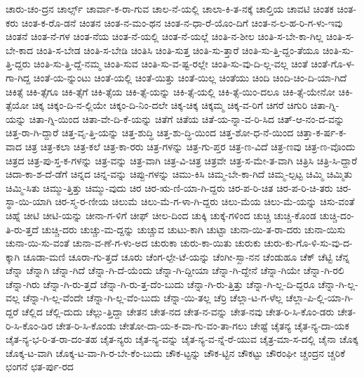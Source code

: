 {ಚಾರು-ಚಂ-ದ್ರನ
ಚಾರ್ಲ್ಸ್
ಚಾರ್ವಾ-ಕ-ರಾ-ಗುವ
ಚಾಲ-ನೆ-ಯಲ್ಲಿ
ಚಾಲಾ-ಕಿ-ತ-ನಕ್ಕೆ
ಚಾಲ್ತಿಯ
ಚಾವಟಿ
ಚಿಂತಕ
ಚಿಂತ-ಕರು
ಚಿಂತ-ಕ-ರೊ-ಡನೆ
ಚಿಂತನ
ಚಿಂತ-ನ-ಮಂ-ಥನ
ಚಿಂತ-ನ-ಧಾ-ರೆ-ಯೊಂ-ದಿಗೆ
ಚಿಂತ-ನ-ಲ-ಹ-ರಿ-ಗ-ಳು-ಇವು
ಚಿಂತನೆ
ಚಿಂತ-ನೆ-ಗಳ
ಚಿಂತ-ನೆಯ
ಚಿಂತ-ನೆ-ಯಲ್ಲಿ
ಚಿಂತ-ನೆ-ಯಲ್ಲೆ
ಚಿಂತಿ-ನ-ಶೀಲ
ಚಿಂತಿ-ಸ-ಬೇ-ಕಾ-ಗಿಲ್ಲ
ಚಿಂತಿ-ಸ-ಬೇ-ಕಾದ
ಚಿಂತಿ-ಸ-ಬೇಡ
ಚಿಂತಿ-ಸ-ಬೇಡಿ
ಚಿಂತಿಸಿ
ಚಿಂತಿ-ಸುತ್ತ
ಚಿಂತಿ-ಸು-ತ್ತಾರೆ
ಚಿಂತಿ-ಸು-ತ್ತಿ-ದ್ದಂ-ತೆಯೂ
ಚಿಂತಿ-ಸು-ತ್ತಿ-ದ್ದರು
ಚಿಂತಿ-ಸು-ತ್ತಿ-ದ್ದೆ-ನಮ್ಮ
ಚಿಂತಿ-ಸುವ
ಚಿಂತಿ-ಸು-ವ-ಷ್ಟ-ರಲ್ಲೇ
ಚಿಂತಿ-ಸು-ವು-ದಿ-ಲ್ಲ-ವಲ್ಲ
ಚಿಂತೆ
ಚಿಂತೆ-ಗೊ-ಳ-ಗಾ-ಗಿದ್ದ
ಚಿಂತೆ-ಯ-ನ್ನುಂಟು
ಚಿಂತೆ-ಯಲ್ಲಿ
ಚಿಂತೆ-ಯಿತ್ತು
ಚಿಂತೆ-ಯಿಲ್ಲ
ಚಿಂತೆಯು
ಚಿಂದಿ
ಚಿಂದಿ-ಚಿಂ-ದಿ-ಯಾ-ಗಿದೆ
ಚಿಕಿತ್ಸೆ
ಚಿಕಿ-ತ್ಸೆಗೂ
ಚಿಕಿ-ತ್ಸೆಗೆ
ಚಿಕಿ-ತ್ಸೆಯ
ಚಿಕಿ-ತ್ಸೆ-ಯನ್ನು
ಚಿಕಿ-ತ್ಸೆ-ಯಲ್ಲಿ
ಚಿಕಿ-ತ್ಸೆ-ಯಿಂ-ದಲೂ
ಚಿಕಿ-ತ್ಸೆ-ಯೇನೋ
ಚಿಕಿ-ತ್ಸೆಯೋ
ಚಿಕ್ಕ
ಚಿಕ್ಕಂ-ದಿ-ನ-ಲ್ಲಿಯೇ
ಚಿಕ್ಕಂ-ದಿ-ನಿಂ-ದಲೇ
ಚಿಕ್ಕ-ಚಿಕ್ಕ
ಚಿಕ್ಕಮ್ಮ
ಚಿಕ್ಕ-ವ-ರಿಗೆ
ಚಿಗರೆ
ಚಿಗುರಿ
ಚಿತಾ-ಗ್ನಿ-ಯನ್ನು
ಚಿತಾ-ಗ್ನಿ-ಯಿಂದ
ಚಿತಾ-ವೇ-ದಿ-ಕೆ-ಯನ್ನು
ಚಿತೆಗೆ
ಚಿತೆಯ
ಚಿತೆ-ಯ-ನ್ನಾ-ವ-ರಿ-ಸಿದ
ಚಿತ್-ಆ-ನಂ-ದ-ವನ್ನು
ಚಿತ್ತ-ರಾ-ಗಿ-ದ್ದಾರೆ
ಚಿತ್ತ-ವೃ-ತ್ತಿ-ಯನ್ನು
ಚಿತ್ತ-ಶುದ್ಧಿ
ಚಿತ್ತ-ಶು-ದ್ಧಿ-ಯಿಂದ
ಚಿತ್ತ-ಶೋ-ಧ-ನೆ-ಯಿಂದ
ಚಿತ್ತಾ-ಕ-ರ್ಷ-ಕ-ವಾದ
ಚಿತ್ರ
ಚಿತ್ರ-ಕಲಾ
ಚಿತ್ರ-ಕಲೆ
ಚಿತ್ರ-ಕಾ-ರರು
ಚಿತ್ರ-ಗಳನ್ನು
ಚಿತ್ರ-ಗು-ಪ್ತರ
ಚಿತ್ರ-ಣ-ವಿದೆ
ಚಿತ್ರ-ಣವು
ಚಿತ್ರ-ಣ-ವೊಂದು
ಚಿತ್ರದ
ಚಿತ್ರ-ಪು-ಸ್ತ-ಕ-ಗಳನ್ನು
ಚಿತ್ರ-ವನ್ನು
ಚಿತ್ರ-ವಾಗಿ
ಚಿತ್ರ-ವಿ-ಚಿತ್ರ
ಚಿತ್ರವೇ
ಚಿತ್ರ-ಸ-ಮೇ-ತ-ವಾಗಿ
ಚಿತ್ರಿಸಿ
ಚಿತ್ರಿ-ಸಿ-ದ್ದಾರೆ
ಚಿದಾ-ಕಾ-ಶ-ದೆ-ಡೆಗೆ
ಚಿನ್ನದ
ಚಿನ್ನ-ವನ್ನು
ಚಿಪ್ಪು-ಗಳನ್ನು
ಚಿಮು-ಕಿಸಿ
ಚಿಮ್ಮ-ಬೇ-ಕಾ-ಗಿದೆ
ಚಿಮ್ಮ-ಲ್ಪಟ್ಟ
ಚಿಮ್ಮಿ
ಚಿಮ್ಮಿತು
ಚಿಮ್ಮಿ-ಸಿತು
ಚಿಮ್ಮು-ತ್ತಿತ್ತು
ಚಿಮ್ಮು-ವುದು
ಚಿರ
ಚಿರ-ಋ-ಣಿ-ಯಾ-ಗಿ-ದ್ದರು
ಚಿರ-ಪ-ರಿ-ಚಿತ
ಚಿರ-ಪ-ರಿ-ಚಿ-ತರು
ಚಿರ-ಸ್ಥಾ-ಯಿ-ಯಾಗಿ
ಚಿರ-ಸ್ಮ-ರ-ಣೀಯ
ಚಿಲುಮೆ
ಚಿಲು-ಮೆ-ಗ-ಳಾ-ಗಿ-ದ್ದರು
ಚಿಲು-ಮೆಯ
ಚಿಲು-ಮೆ-ಯನ್ನು
ಚಿಸು-ವಂತೆ
ಚಿಹ್ನೆ
ಚೀಟಿ
ಚೀಟಿ-ಯನ್ನು
ಚೀನಾ-ಗ-ಳಿಗೆ
ಚೀಫ್
ಚೀಲ-ದಿಂದ
ಚುಕ್ಕಿ
ಚುಕ್ಕೆ-ಗಳಿಂದ
ಚುಚ್ಚಿ
ಚುಚ್ಚಿ-ಕೊಂಡ
ಚುಚ್ಚಿ-ದಂ-ತಿ-ರು-ತ್ತದೆ
ಚುಚ್ಚಿ-ದರು
ಚುಚ್ಚು-ಮ-ದ್ದನ್ನು
ಚುಚ್ಚುವ
ಚುಟು-ಕಾಗಿ
ಚುಟ್ಟಾ
ಚುನಾ-ಯಿ-ತ-ರಾ-ದರು
ಚುನಾ-ಯಿಸು
ಚುನಾ-ಯಿ-ಸು-ವಂತೆ
ಚುನಾ-ವ-ಣೆ-ಗ-ಳು-ಅದ
ಚುರುಕಾ
ಚುರು-ಕಾ-ಯಿತು
ಚುರುಕು
ಚುರು-ಕು-ಗೊ-ಳಿ-ಸು-ವು-ದ-ಕ್ಕಾಗಿ
ಚೂಡಾ-ಮಣಿ
ಚೂರಾ-ಗು-ತ್ತದೆ
ಚೂರು
ಚೆಂಗ-ಲ್ಪೇ-ಟೆ-ಯನ್ನು
ಚೆಂಗೀ-ಸ್ಖಾ-ನನ
ಚೆಂಡುಹೂ
ಚೆಕ್
ಚೆಟ್ಟಿ
ಚೆನ್ನ
ಚೆನ್ನಾ
ಚೆನ್ನಾಗಿ
ಚೆನ್ನಾ-ಗಿದೆ
ಚೆನ್ನಾ-ಗಿ-ದೆ-ಯೆಂದು
ಚೆನ್ನಾ-ಗಿ-ದ್ದೀಯಾ
ಚೆನ್ನಾ-ಗಿ-ದ್ದೇನೆ
ಚೆನ್ನಾ-ಗಿಯೇ
ಚೆನ್ನಾ-ಗಿ-ರಲಿ
ಚೆನ್ನಾ-ಗಿರು
ಚೆನ್ನಾ-ಗಿ-ರು-ತ್ತದೆ
ಚೆನ್ನಾ-ಗಿ-ರು-ತ್ತ-ದೆಂ-ಬುದು
ಚೆನ್ನಾ-ಗಿ-ರು-ತ್ತಿತ್ತು
ಚೆನ್ನಾ-ಗಿ-ಲ್ಲ-ದಿ-ದ್ದರೂ
ಚೆನ್ನಾ-ಗಿ-ಲ್ಲ-ವಲ್ಲ
ಚೆನ್ನಾ-ಗಿ-ಲ್ಲ-ವೆಂದೇ
ಚೆನ್ನಾ-ಗಿ-ಲ್ಲ-ವೆಂ-ಬುದು
ಚೆನ್ನಾ-ಯಿ-ತಲ್ಲ
ಚೆರ್ರಿ
ಚೆಲ್ಲಾ-ಟ-ಗ-ಳೆಲ್ಲ
ಚೆಲ್ಲಾ-ಪಿ-ಲ್ಲಿ-ಯಾ-ಗಿ-ದ್ದರೆ
ಚೆಲ್ಲಿದ
ಚೆಲ್ಲಿ-ದುದು
ಚೆಲ್ಲು-ತ್ತಿದ್ದಾ
ಚೇತನ
ಚೇತ-ನದ
ಚೇತ-ನ-ವನ್ನು
ಚೇತ-ನವು
ಚೇತ-ರಿ-ಸಿ-ಕೊಂ-ಡರು
ಚೇತ-ರಿ-ಸಿ-ಕೊಂ-ಡಿರ
ಚೇತ-ರಿ-ಸಿ-ಕೊಂಡು
ಚೇತೋ-ದಾ-ಯ-ಕ-ವಾ-ಗು-ವಂ-ತಾ-ಗಲು
ಚೇಷ್ಟೆ
ಚೈತನ್ಯ
ಚೈತ-ನ್ಯ-ದಾ-ಯಕ
ಚೈತ-ನ್ಯ-ಭ-ರಿ-ತ-ರಾ-ದಂ-ತಹ
ಚೈತ-ನ್ಯರು
ಚೈತ-ನ್ಯ-ವನ್ನು
ಚೈತ-ನ್ಯ-ವ-ನ್ನೆ-ರೆ-ಯುವ
ಚೈತ್ರ-ಮಾ-ಸ-ದಲ್ಲಿ
ಚೈನಾ
ಚೊಕ್ಕ
ಚೊಕ್ಕ-ಟ-ವಾಗಿ
ಚೊಕ್ಕ-ಟ-ವಾ-ಗಿ-ರ-ಬೇ-ಕೆಂ-ಬುದು
ಚೌಕ-ಟ್ಟನ್ನು
ಚೌಕ-ಟ್ಟಿನ
ಚೌಕಟ್ಟು
ಚೌರಂಘೀ
ಚ್ಚಂದ್ರನ
ಚ್ಚರಿಕೆ
ಛಂಗನೆ
ಛತ-ರ್ಪು-ರದ
}
